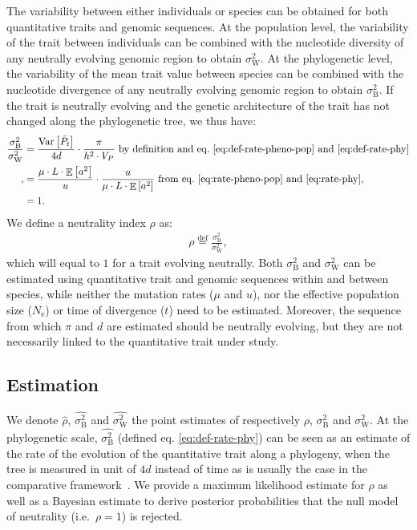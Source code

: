\documentclass{article}
\newcommand{\defEqual}{\stackrel{\text{def}}{=}}
\newcommand{\Multiply}{\cdot}
\DeclareMathOperator{\E}{\mathbb{E}}
\DeclareMathOperator{\Var}{\text{Var}}
\newcommand{\Ne}{N_{\text{e}}}
\newcommand{\Time}{t}
\newcommand{\Trait}{P}
\newcommand{\Heritability}{h^2}
\newcommand{\MeanTrait}{\bar{\Trait_{\Time}}}
\newcommand{\VarPhy}{\Var \left[\MeanTrait\right]}
\newcommand{\MutationRatePheno}{\mu}
\newcommand{\MutationRateNuc}{u}
\newcommand{\NbrLoci}{L}
\newcommand{\VarPhenotype}{V_{\Trait}}
\newcommand{\GenArchi}{\NbrLoci \Multiply \E \left[ a^2 \right]}
\newcommand{\RateBetween}{\sigma^2_{\mathrm{B}}}
\newcommand{\RateWhithin}{\sigma^2_{\mathrm{W}}}
\newcommand{\EstRateBetween}{\widehat{\RateBetween}}
\newcommand{\EstRateWhithin}{\widehat{\RateWhithin}}
\newcommand{\NI}{\rho}
\newcommand{\EstNI}{\widehat{\rho}}
\begin{document}
The variability between either individuals or species can be obtained for both quantitative traits and genomic sequences.
At the population level, the variability of the trait between individuals can be combined with the nucleotide diversity of any neutrally evolving genomic region to obtain $\RateWhithin$.
At the phylogenetic level, the variability of the mean trait value between species can be combined with the nucleotide divergence of any neutrally evolving genomic region to obtain $\RateBetween$.
If the trait is neutrally evolving and the genetic architecture of the trait has not changed along the phylogenetic tree, we thus have:
\begin{align}
    \frac{\RateBetween}{\RateWhithin} &= \frac{\VarPhy}{4 d} \Multiply \frac{\pi}{\Heritability \Multiply \VarPhenotype} \text{ by definition and eq.~\ref{eq:def-rate-pheno-pop} and~\ref{eq:def-rate-phy}}\\,
 &= \frac{\MutationRatePheno \Multiply \GenArchi}{\MutationRateNuc} \Multiply \frac{\MutationRateNuc}{\MutationRatePheno \Multiply \GenArchi} \text{ from eq.~\ref{eq:rate-pheno-pop} and~\ref{eq:rate-phy}}, \\
    &= 1.
\end{align}
We define a neutrality index $\NI$ as:
\begin{align}
\NI \defEqual \frac{\RateBetween}{\RateWhithin},
\end{align}
 which will equal to $1$ for a trait evolving neutrally.
Both $\RateBetween$ and $\RateWhithin$ can be estimated using quantitative trait and genomic sequences within and between species, while neither the mutation rates ($\MutationRatePheno$ and $\MutationRateNuc$), nor the effective population size ($\Ne$) or time of divergence ($\Time$) need to be estimated.
Moreover, the sequence from which $\pi$ and $d$ are estimated should be neutrally evolving, but they are not necessarily linked to the quantitative trait under study.

\subsection*{Estimation}\label{subsec:estimate}

We denote $\EstNI$, $\EstRateBetween$ and $\EstRateWhithin$ the point estimates of respectively $\NI$, $\RateBetween$ and $\RateWhithin$.
At the phylogenetic scale, $\EstRateBetween$ (defined eq. \ref{eq:def-rate-phy}) can be seen as an estimate of the rate of the evolution of the quantitative trait along a phylogeny, when the tree is measured in unit of $4d$ instead of time as is usually the case in the comparative framework~\parencite{felsenstein_phylogenies_1985, omeara_testing_2006}. 
We provide a maximum likelihood estimate for $\NI$ as well as a Bayesian estimate to derive posterior probabilities that the null model of neutrality (i.e.~$\NI = 1$) is rejected.
\end{document}

